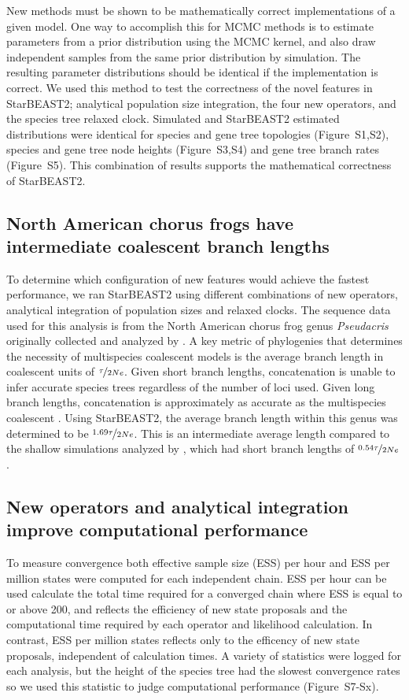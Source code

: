 \documentclass[12pt]{article}
\begin{document}
New methods must be shown to be mathematically correct implementations of a
given model. One way to accomplish this for MCMC methods is to estimate
parameters from a prior distribution using the MCMC kernel, and also draw
independent samples from the same prior distribution by simulation. The
resulting parameter distributions should be identical if the implementation is
correct. We used this method to test the correctness of the novel features in
StarBEAST2; analytical population size integration, the four new operators, and
the species tree relaxed clock. Simulated and StarBEAST2 estimated distributions
were identical for species and gene tree topologies (Figure~S1,S2), species and
gene tree node heights (Figure~S3,S4) and gene tree branch rates (Figure~S5).
This combination of results supports the mathematical correctness of StarBEAST2.

\subsection{North American chorus frogs have intermediate coalescent branch lengths}

To determine which configuration of new features would achieve the fastest
performance, we ran StarBEAST2 using different combinations of new operators,
analytical integration of population sizes and relaxed clocks. The sequence data
used for this analysis is from the North American chorus frog genus
\textit{Pseudacris} originally collected and analyzed by \cite{Barrow201478}. A
key metric of phylogenies that determines the necessity of multispecies
coalescent models is the average branch length in coalescent units of
$\nicefrac{\tau}{2Ne}$. Given short branch lengths, concatenation is unable to
infer accurate species trees regardless of the number of loci used. Given long
branch lengths, concatenation is approximately as accurate as the multispecies
coalescent \citep{Ogilvie01052016}. Using StarBEAST2, the average branch length
within this genus was determined to be $\nicefrac{1.69\tau}{2Ne}$. This is an
intermediate average length compared to the shallow simulations analyzed by
\cite{Ogilvie01052016}, which had short branch lengths of
$\nicefrac{0.54\tau}{2Ne}$.

\subsection{New operators and analytical integration improve computational performance}

To measure convergence both effective sample size (ESS) per hour and ESS per
million states were computed for each independent chain. ESS per hour can be
used calculate the total time required for a converged chain where ESS is equal
to or above 200, and reflects the efficiency of new state proposals and the
computational time required by each operator and likelihood calculation. In
contrast, ESS per million states reflects only to the efficency of new state
proposals, independent of calculation times. A variety of statistics were logged
for each analysis, but the height of the species tree had the slowest
convergence rates so we used this statistic to judge computational performance
(Figure~S7-Sx).
\end{document}

